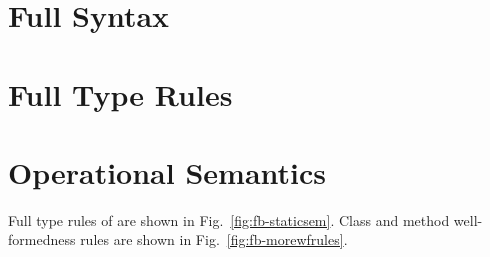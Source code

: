 \section{Full Syntax}



\section{Full Type Rules}




\section{Operational Semantics}



Full type rules of \FB are shown in Fig.~\ref{fig:fb-staticsem}. Class
and method well-formedness rules are shown in
Fig.~\ref{fig:fb-morewfrules}.



